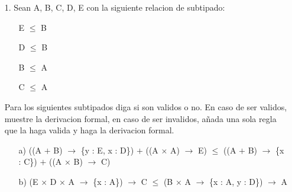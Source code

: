 \documentclass{article}
\begin{document}
    \begin{itemize}
        \item[1.] Sean A, B, C, D, E con la siguiente relacion de subtipado:
        \begin{center}
            \begin{itemize}
                \item[ ] E $\leq$ B
                \item[ ] D $\leq$ B
                \item[ ] B $\leq$ A
                \item[ ] C $\leq$ A 
            \end{itemize}
        \end{center}

        Para los siguientes subtipados diga si son validos o no. En caso de ser validos, muestre la derivacion formal, en caso de ser invalidos, añada una sola regla que la haga valida y haga la derivacion formal.

        \begin{itemize}
            \item[a)] ((A $+$ B) $\rightarrow$ \{y : E, x : D\}) $+$ ((A $×$ A) $\rightarrow$ E) $\leq$ ((A $+$ B) $\rightarrow$ \{x : C\}) $+$ ((A × B) $\rightarrow$ C)
            \item[b)] (E × D × A $\rightarrow$ \{x : A\}) $\rightarrow$ C $\leq$ (B × A $\rightarrow$ \{x : A, y : D\}) $\rightarrow$  A
        \end{itemize}
    \end{itemize}
\end{document}
